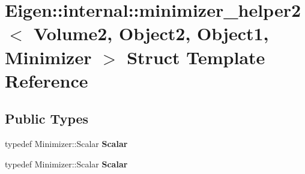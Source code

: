 \hypertarget{struct_eigen_1_1internal_1_1minimizer__helper2}{}\section{Eigen\+:\+:internal\+:\+:minimizer\+\_\+helper2$<$ Volume2, Object2, Object1, Minimizer $>$ Struct Template Reference}
\label{struct_eigen_1_1internal_1_1minimizer__helper2}
\subsection*{Public Types}
\begin{DoxyCompactItemize}
\item 
\mbox{\label{struct_eigen_1_1internal_1_1minimizer__helper2_a6e1ada2265caa8ca38475be63f21ba52}} 
typedef Minimizer\+::\+Scalar {\bfseries Scalar}
\item 
\mbox{\label{struct_eigen_1_1internal_1_1minimizer__helper2_a6e1ada2265caa8ca38475be63f21ba52}} 
typedef Minimizer\+::\+Scalar {\bfseries Scalar}
\end{DoxyCompactItemize}
